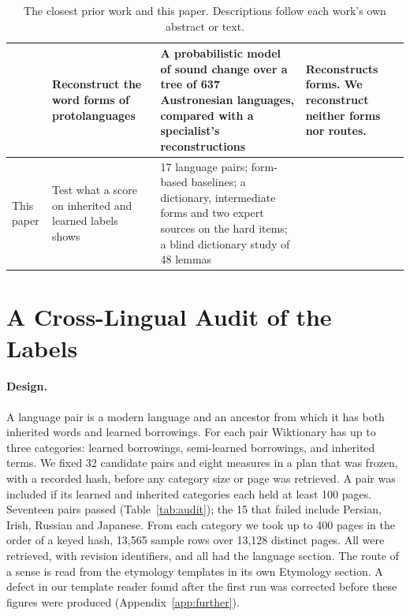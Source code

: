 \documentclass[11pt]{article}
\begin{document}
\begin{table}[t]
\begin{tabular}{p{}p{}p{}p{}}
\addlinespace
\citet{bouchardcote2013automated} & Reconstruct the word forms of protolanguages & A probabilistic model of sound change over a tree of 637 Austronesian languages, compared with a specialist's reconstructions & Reconstructs forms. We reconstruct neither forms nor routes. \\
\midrule
This paper & Test what a score on inherited and learned labels shows & 17 language pairs; form-based baselines; a dictionary, intermediate forms and two expert sources on the hard items; a blind dictionary study of 48 lemmas & \\
\bottomrule
\end{tabular}
\caption{The closest prior work and this paper. Descriptions follow each work's own abstract or text.}
\label{tab:prior}
\end{table}

\section{A Cross-Lingual Audit of the Labels}
\label{sec:audit}

\paragraph{Design.} A language pair is a modern language and an ancestor from which it has both inherited words and learned borrowings. For each pair Wiktionary has up to three categories: learned borrowings, semi-learned borrowings, and inherited terms. We fixed 32 candidate pairs and eight measures in a plan that was frozen, with a recorded hash, before any category size or page was retrieved. A pair was included if its learned and inherited categories each held at least 100 pages. Seventeen pairs passed (Table~\ref{tab:audit}); the 15 that failed include Persian, Irish, Russian and Japanese. From each category we took up to 400 pages in the order of a keyed hash, 13,565 sample rows over 13,128 distinct pages. All were retrieved, with revision identifiers, and all had the language section. The route of a sense is read from the etymology templates in its own Etymology section. A defect in our template reader found after the first run was corrected before these figures were produced (Appendix~\ref{app:further}).
\end{document}
